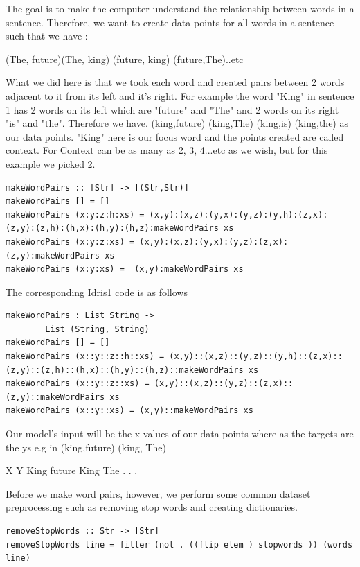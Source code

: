 \documentclass[]{report}
\begin{document}
The goal is to make the computer understand the relationship between words in a sentence. 
Therefore, we want to create data points for all words in a sentence such that we have :-

(The, future)(The, king) (future, king) (future,The)..etc 

What we did here is that we took each word and created pairs between 2 words adjacent 
to it from its left and it's right. For example the word "King" in sentence 1 has 2 words 
on its left which are "future" and "The" and 2 words on its right "is" and "the". Therefore we have.  
(king,future) (king,The) (king,is) (king,the) as our data points. "King" here is our focus word and the points created are called context. For
Context can be as many as 2, 3, 4...etc as we wish, but for this example we picked 2.

\begin{verbatim}
makeWordPairs :: [Str] -> [(Str,Str)]
makeWordPairs [] = []
makeWordPairs (x:y:z:h:xs) = (x,y):(x,z):(y,x):(y,z):(y,h):(z,x):(z,y):(z,h):(h,x):(h,y):(h,z):makeWordPairs xs
makeWordPairs (x:y:z:xs) = (x,y):(x,z):(y,x):(y,z):(z,x):(z,y):makeWordPairs xs
makeWordPairs (x:y:xs) =  (x,y):makeWordPairs xs
\end{verbatim}


The corresponding Idris1 code is as follows 
\begin{verbatim}
makeWordPairs : List String -> 
		List (String, String)
makeWordPairs [] = []
makeWordPairs (x::y::z::h::xs) = (x,y)::(x,z)::(y,z)::(y,h)::(z,x)::(z,y)::(z,h)::(h,x)::(h,y)::(h,z)::makeWordPairs xs
makeWordPairs (x::y::z::xs) = (x,y)::(x,z)::(y,z)::(z,x)::(z,y)::makeWordPairs xs
makeWordPairs (x::y::xs) = (x,y)::makeWordPairs xs

\end{verbatim}

Our model’s input will be the x values of our data points where as the targets are the ys e.g in (king,future) (king, The)

X       Y   
King    future
King    The
.
.
.

  
Before we make word pairs, however, we perform some common dataset preprocessing such as removing stop words and creating dictionaries.

\begin{verbatim}
removeStopWords :: Str -> [Str]
removeStopWords line = filter (not . ((flip elem ) stopwords )) (words line)
\end{verbatim}
\end{document}
